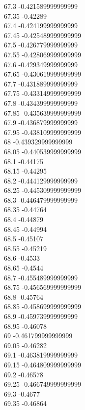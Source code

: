 {67.3	-0.421589999999999\\
67.35	-0.42289\\
67.4	-0.424199999999999\\
67.45	-0.425489999999999\\
67.5	-0.426779999999999\\
67.55	-0.428069999999999\\
67.6	-0.429349999999999\\
67.65	-0.430619999999999\\
67.7	-0.431889999999999\\
67.75	-0.433149999999999\\
67.8	-0.434399999999999\\
67.85	-0.435639999999999\\
67.9	-0.436879999999999\\
67.95	-0.438109999999999\\
68	-0.439329999999999\\
68.05	-0.440539999999999\\
68.1	-0.44175\\
68.15	-0.44295\\
68.2	-0.444129999999999\\
68.25	-0.445309999999999\\
68.3	-0.446479999999999\\
68.35	-0.44764\\
68.4	-0.44879\\
68.45	-0.44994\\
68.5	-0.45107\\
68.55	-0.45219\\
68.6	-0.4533\\
68.65	-0.4544\\
68.7	-0.455489999999999\\
68.75	-0.456569999999999\\
68.8	-0.45764\\
68.85	-0.458699999999999\\
68.9	-0.459739999999999\\
68.95	-0.46078\\
69	-0.461799999999999\\
69.05	-0.46282\\
69.1	-0.463819999999999\\
69.15	-0.464809999999999\\
69.2	-0.46578\\
69.25	-0.466749999999999\\
69.3	-0.4677\\
69.35	-0.46864\\
}
